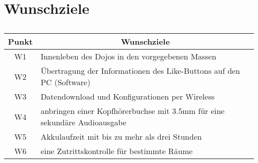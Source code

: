 \section*{Wunschziele}
\begin{table}[h]
\centering
\begin{tabular}{c|c|l}
	\toprule 
	\textbf{Punkt} & \multicolumn{2}{c}{\textbf{Wunschziele}} \\ 
	\hline 
	W1 & \multicolumn{2}{l}{Innenleben des Dojos in den vorgegebenen Massen} \\
	\hline 
	W2 & \multicolumn{2}{l}{Übertragung der Informationen des Like-Buttons auf den PC (Software)} \\
	\hline 
	W3 & \multicolumn{2}{l}{Datendownload und Konfigurationen per Wireless} \\
	\hline 
	W4 & \multicolumn{2}{l}{anbringen einer Kopfhörerbuchse mit 3.5mm für eine sekundäre Audioausgabe} \\ 
	\hline 
	W5 & \multicolumn{2}{l}{Akkulaufzeit mit bis zu mehr als drei Stunden} \\
	\hline 
	W6 & \multicolumn{2}{l}{eine Zutrittskontrolle für bestimmte Räume} \\
	\bottomrule 
	\end{tabular}
\caption{}
\label{tab:wunschziele}
\end{table}	
\newpage
